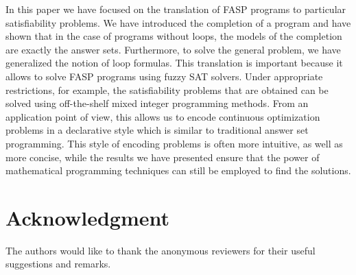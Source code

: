 \documentclass{tlp}
\begin{document}
In this paper we have focused on the translation of FASP programs to particular satisfiability problems. We have introduced the completion of a program and have shown that in the case of programs without loops, the models of the completion are exactly the answer sets. Furthermore, to solve the general problem, we have generalized the notion of loop formulas. This translation is important because it allows to solve FASP programs using fuzzy SAT solvers. Under appropriate restrictions, for example, the satisfiability problems that are obtained can be solved using off-the-shelf mixed integer programming methods.  From an application point of view, this allows us to encode continuous optimization problems in a declarative style which is similar to traditional answer set programming.   This style of encoding problems is often more intuitive, as well as more concise, while the results we have presented ensure that the power of mathematical programming techniques can still be employed to find the solutions.

\section*{Acknowledgment}
The authors would like to thank the anonymous reviewers for their useful suggestions and remarks.


\end{document}
